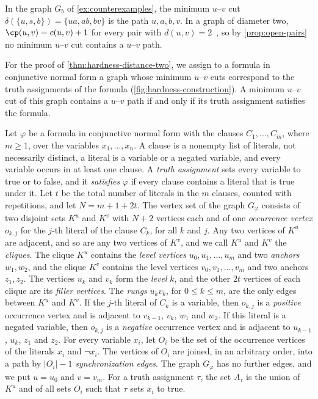 In the graph $G_b$ of \cref{ex:counterexamples}, the minimum $u$--$v$ cut $\delta(\{u, s, b\}) = \{ua, ab, bv\}$ is the path $u, a, b, v$.
In a graph of diameter two, $\cp(u, v) = c(u, v) + 1$ for every pair with $d(u, v) = 2$~\cite[Theorem~15]{Michel2025MinCutPath}, so by \cref{prop:open-pairs} no minimum $u$--$v$ cut contains a $u$--$v$ path.

For the proof of \cref{thm:hardness-distance-two}, we assign to a formula in conjunctive normal form a graph whose minimum $u$--$v$ cuts correspond to the truth assignments of the formula (\cref{fig:hardness-construction}).
A minimum $u$--$v$ cut of this graph contains a $u$--$v$ path if and only if its truth assignment satisfies the formula.

\begin{definition}
\label{def:formula-graph}
Let $\varphi$ be a formula in conjunctive normal form with the clauses $C_1, \dots, C_m$, where $m \geq 1$, over the variables $x_1, \dots, x_n$.
A clause is a nonempty list of literals, not necessarily distinct, a literal is a variable or a negated variable, and every variable occurs in at least one clause.
A \emph{truth assignment} sets every variable to true or to false, and it \emph{satisfies} $\varphi$ if every clause contains a literal that is true under it.
Let $t$ be the total number of literals in the $m$ clauses, counted with repetitions, and let $N = m + 1 + 2t$.
The vertex set of the graph $G_\varphi$ consists of two disjoint sets $K^u$ and $K^v$ with $N + 2$ vertices each and of one \emph{occurrence vertex} $o_{k,j}$ for the $j$-th literal of the clause $C_k$, for all $k$ and $j$.
Any two vertices of $K^u$ are adjacent, and so are any two vertices of $K^v$, and we call $K^u$ and $K^v$ the \emph{cliques}.
The clique $K^u$ contains the \emph{level vertices} $u_0, u_1, \dots, u_m$ and two \emph{anchors} $w_1, w_2$, and the clique $K^v$ contains the level vertices $v_0, v_1, \dots, v_m$ and two anchors $z_1, z_2$.
The vertices $u_k$ and $v_k$ form the \emph{level} $k$, and the other $2t$ vertices of each clique are its \emph{filler vertices}.
The \emph{rungs} $u_k v_k$, for $0 \leq k \leq m$, are the only edges between $K^u$ and $K^v$.
If the $j$-th literal of $C_k$ is a variable, then $o_{k,j}$ is a \emph{positive} occurrence vertex and is adjacent to $v_{k-1}$, $v_k$, $w_1$ and $w_2$.
If this literal is a negated variable, then $o_{k,j}$ is a \emph{negative} occurrence vertex and is adjacent to $u_{k-1}$, $u_k$, $z_1$ and $z_2$.
For every variable $x_i$, let $O_i$ be the set of the occurrence vertices of the literals $x_i$ and $\neg x_i$.
The vertices of $O_i$ are joined, in an arbitrary order, into a path by $|O_i| - 1$ \emph{synchronization edges}.
The graph $G_\varphi$ has no further edges, and we put $u = u_0$ and $v = v_m$.
For a truth assignment $\tau$, the set $A_\tau$ is the union of $K^u$ and of all sets $O_i$ such that $\tau$ sets $x_i$ to true.
\end{definition}

